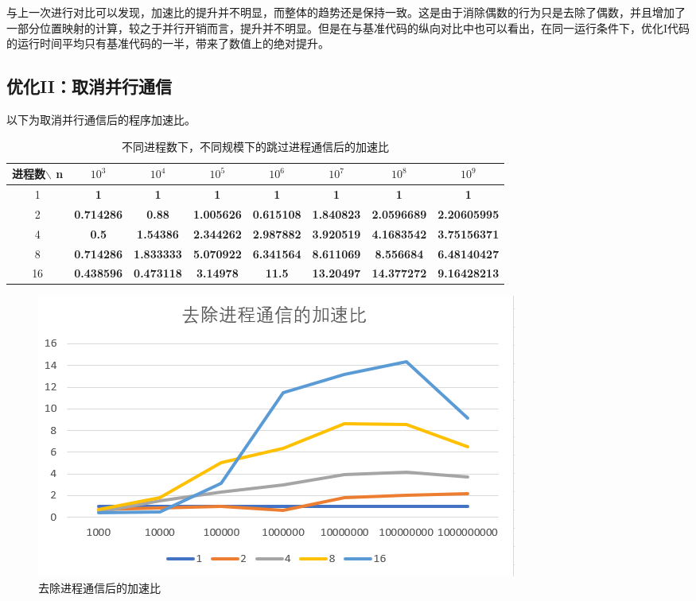\documentclass[a4paper,11pt,UTF8]{ctexart}
\begin{document}
与上一次进行对比可以发现，加速比的提升并不明显，而整体的趋势还是保持一致。这是由于消除偶数的行为只是去除了偶数，并且增加了一部分位置映射的计算，较之于并行开销而言，提升并不明显。但是在与基准代码的纵向对比中也可以看出，在同一运行条件下，优化I代码的运行时间平均只有基准代码的一半，带来了数值上的绝对提升。

\subsection{优化II：取消并行通信}
以下为取消并行通信后的程序加速比。
\begin{table}[ht]
  \centering
  \caption{不同进程数下，不同规模下的跳过进程通信后的加速比}
  \begin{tabular}{cccccccc}
    \toprule
    进程数$\backslash$ n & $10^3$             & $10^4$            & $10^5$           & $10^6$          & $10^7$          & $10^8$         & $10^9$         \\\midrule
    1   & \textbf{1}       & \textbf{1}       & \textbf{1}       & \textbf{1}       & \textbf{1}        & \textbf{1}        & \textbf{1}         \\
    2  & \textbf{0.714286} & \textbf{0.88}     & \textbf{1.005626} & \textbf{0.615108} & \textbf{1.840823} & \textbf{2.0596689} & \textbf{2.20605995} \\
    4  & \textbf{0.5}      & \textbf{1.54386}  & \textbf{2.344262} & \textbf{2.987882} & \textbf{3.920519} & \textbf{4.1683542} & \textbf{3.75156371} \\
    8 & \textbf{0.714286} & \textbf{1.833333} & \textbf{5.070922} & \textbf{6.341564} & \textbf{8.611069} & \textbf{8.556684} & \textbf{6.48140427} \\
    16 & \textbf{0.438596} & \textbf{0.473118} & \textbf{3.14978}  & \textbf{11.5}     & \textbf{13.20497} & \textbf{14.377272} & \textbf{9.16428213}\\\bottomrule
    \end{tabular}
  \label{label}
    \end{table}
  \begin {figure}[h]
  \centering %
  \includegraphics[width=\textwidth]{4854-041410.png}
  \caption{去除进程通信后的加速比} %
  \label{five}
  \end {figure}
\end{document}
